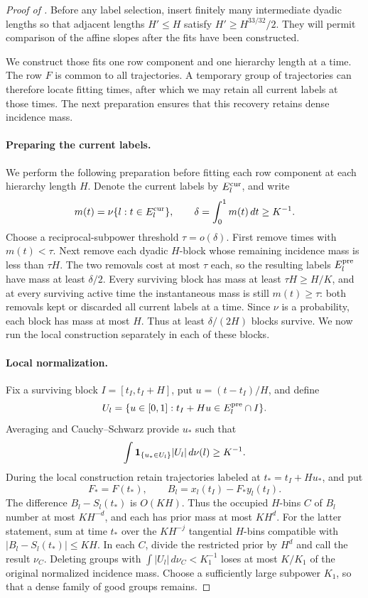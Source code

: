\begin{proof}[Proof of ]
Before any label selection, insert finitely many intermediate dyadic
lengths so that adjacent lengths \(H'\le H\) satisfy
\(H'\ge H^{33/32}/2\).  They will permit comparison of the affine
slopes after the fits have been constructed.

We construct those fits one row component and one hierarchy length at
a time.  The row \(F\) is common to all trajectories.  A temporary
group of trajectories can therefore locate fitting times, after which
we may retain all current labels at those times.  The next preparation
ensures that this recovery retains dense incidence mass.

\paragraph{Preparing the current labels.}
We perform the following preparation before fitting each row component
at each hierarchy length \(H\).  Denote the current labels by
\(E_l^{\rm cur}\), and write
\[
 m(t)=\nu\{l:t\in E_l^{\rm cur}\},\qquad
 \delta=\int_0^1m(t)\,dt\ge K^{-1}.
\]
Choose a reciprocal-subpower threshold \(\tau=o(\delta)\).
First remove times with \(m(t)<\tau\).  Next remove each dyadic
\(H\)-block whose remaining incidence mass is less than \(\tau H\).
The two removals cost at most \(\tau\) each, so the resulting labels
\(E_l^{\rm pre}\) have mass at least \(\delta/2\).
Every surviving block has mass at least \(\tau H\ge H/K\), and at
every surviving active time the instantaneous mass is still
\(m(t)\ge\tau\): both removals kept or discarded all current labels
at a time.  Since \(\nu\) is a probability, each block has mass at
most \(H\).  Thus at least \(\delta/(2H)\) blocks survive.
We now run the local construction separately in each of these blocks.

\paragraph{Local normalization.}
Fix a surviving block \(I=[t_I,t_I+H]\), put \(u=(t-t_I)/H\), and define
\[
 U_l=\{u\in[0,1]:t_I+Hu\in E_l^{\rm pre}\cap I\}.
\]
Averaging and Cauchy--Schwarz provide \(u_*\) such that
\[
 \int \mathbf 1_{\{u_*\in U_l\}}|U_l|\,d\nu(l)\ge K^{-1}.
\]
During the local construction retain trajectories labeled at
\(t_*=t_I+Hu_*\), and put
\[
 F_*=F(t_*),\qquad B_l=x_l(t_I)-F_*y_l(t_I).
\]
The difference \(B_l-S_l(t_*)\) is \(O(KH)\).
Thus the occupied \(H\)-bins \(C\) of \(B_l\) number at most \(KH^{-d}\),
and each has prior mass at most \(KH^d\).
For the latter statement, sum  at time \(t_*\)
over the \(KH^{-j}\) tangential \(H\)-bins compatible with
\(|B_l-S_l(t_*)|\le KH\).
In each \(C\), divide the restricted prior by \(H^d\) and call the
result \(\nu_C\).  Deleting groups with
\(\int |U_l|\,d\nu_C<K_1^{-1}\) loses at most \(K/K_1\) of the original
normalized incidence mass.  Choose a sufficiently large subpower
\(K_1\), so that a dense family of good groups remains.


\end{proof}

